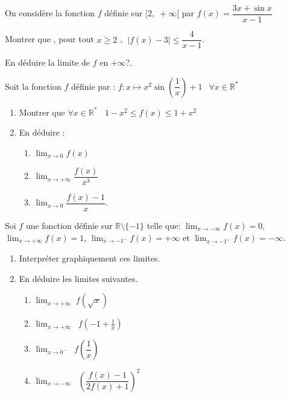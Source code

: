         \begin{exercice}
        On considère la fonction $ f $ définie sur $ [2,\;+\infty[ $ par $ f(x)=\dfrac{3x+\sin x}{x-1} $
        
Montrer que , pour tout $ x\geq 2 $ ,  $ \;\left |f(x) -3\right | \leq \dfrac{4}{x-1}$.

 En déduire la limite de  $ f $ en $ +\infty?.$
\end{exercice}
  \begin{exercice}
 Soit  la fonction $ f $ définie par :  $ f : x\mapsto x^2 \sin\left(\dfrac{1}{x}\right)+1\,\;$ $ \forall x\in\mathbb{R}^{\ast} $
 \begin{enumerate}
\item   Montrer que  $ \forall x\in\mathbb{R}^{\ast} \;\;$  $ 1 -x^2\leq  f(x) \leq  1  +x^2$
\item  En déduire :
\begin{enumerate}
\item $\displaystyle \lim_{x \to 0}{f(x)}$
\item $\displaystyle \lim_{x \to +\infty}{\dfrac{f(x)}{x^3}}$
\item  $ \displaystyle\lim_{x \to 0}{\dfrac{f(x)-1}{x}}$.
 \end{enumerate}
  \end{enumerate}
\end{exercice}
  \begin{exercice}
   Soi  $ f $  une fonction  définie sur $\mathbb{R}\setminus\{-1\} $ telle que: $ \displaystyle\lim_{x \to -\infty}f(x)=0 $,  $ \displaystyle\lim_{x \to +\infty}f(x)=1$,  $ \displaystyle\lim_{x \to -1^{-}}f(x)=+\infty $  et  $\displaystyle \lim_{x \to -1^{+}}f(x)=-\infty $. 
\begin{enumerate}
\item Interpréter graphiquement ces  limites.
\item  En déduire   les limites suivantes.
\begin{enumerate}
\item  $ \displaystyle\lim_{x \to+\infty}\; f\left(\sqrt{x}\right)$
\item $ \displaystyle\lim_{x \to   +\infty}\;\;f\left(-1+\frac{1}{x}\right)$
\item $\displaystyle \lim_{x \to 0^{-}}\;\;f\left(\dfrac{1}{x}\right)$
\item  $ \displaystyle\lim_{x \to -\infty}\;\;\left(\dfrac{f(x)-1}{2f(x)+1}\right)^2$
\end{enumerate}
\end{enumerate}
\end{exercice}
